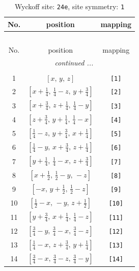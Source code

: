 \documentclass[fleqn,8pt]{jsarticle}
\begin{document}
\begin{longtable}{ccc}
\caption{Wyckoff site: {\tt 24e}, site symmetry: {\tt 1}}
 \\
 \hline \hline
No. & position & mapping \\ \hline \endfirsthead

\multicolumn{2}{l}{\tablename\ \thetable{}} \\
 \hline \hline
No. & position & mapping \\ \hline \endhead

 \hline \hline
\multicolumn{2}{r}{\footnotesize\it continued ...} \\ \endfoot

 \hline \hline
\multicolumn{2}{r}{} \\ \endlastfoot

1 & $\left[ x,\, y,\, z \right]$ & {\tt [1]} \\ \hline
2 & $\left[ x + \frac{1}{4},\, \frac{1}{4} - z,\, y + \frac{3}{4} \right]$ & {\tt [2]} \\ \hline
3 & $\left[ x + \frac{3}{4},\, z + \frac{1}{4},\, \frac{1}{4} - y \right]$ & {\tt [3]} \\ \hline
4 & $\left[ z + \frac{3}{4},\, y + \frac{1}{4},\, \frac{1}{4} - x \right]$ & {\tt [4]} \\ \hline
5 & $\left[ \frac{1}{4} - z,\, y + \frac{3}{4},\, x + \frac{1}{4} \right]$ & {\tt [5]} \\ \hline
6 & $\left[ \frac{1}{4} - y,\, x + \frac{3}{4},\, z + \frac{1}{4} \right]$ & {\tt [6]} \\ \hline
7 & $\left[ y + \frac{1}{4},\, \frac{1}{4} - x,\, z + \frac{3}{4} \right]$ & {\tt [7]} \\ \hline
8 & $\left[ x + \frac{1}{2},\, \frac{1}{2} - y,\, - z \right]$ & {\tt [8]} \\ \hline
9 & $\left[ - x,\, y + \frac{1}{2},\, \frac{1}{2} - z \right]$ & {\tt [9]} \\ \hline
10 & $\left[ \frac{1}{2} - x,\, - y,\, z + \frac{1}{2} \right]$ & {\tt [10]} \\ \hline
11 & $\left[ y + \frac{3}{4},\, x + \frac{1}{4},\, \frac{1}{4} - z \right]$ & {\tt [11]} \\ \hline
12 & $\left[ \frac{3}{4} - y,\, \frac{3}{4} - x,\, \frac{3}{4} - z \right]$ & {\tt [12]} \\ \hline
13 & $\left[ \frac{1}{4} - x,\, z + \frac{3}{4},\, y + \frac{1}{4} \right]$ & {\tt [13]} \\ \hline
14 & $\left[ \frac{3}{4} - x,\, \frac{3}{4} - z,\, \frac{3}{4} - y \right]$ & {\tt [14]} \\ \hline

\end{longtable}
\end{document}
